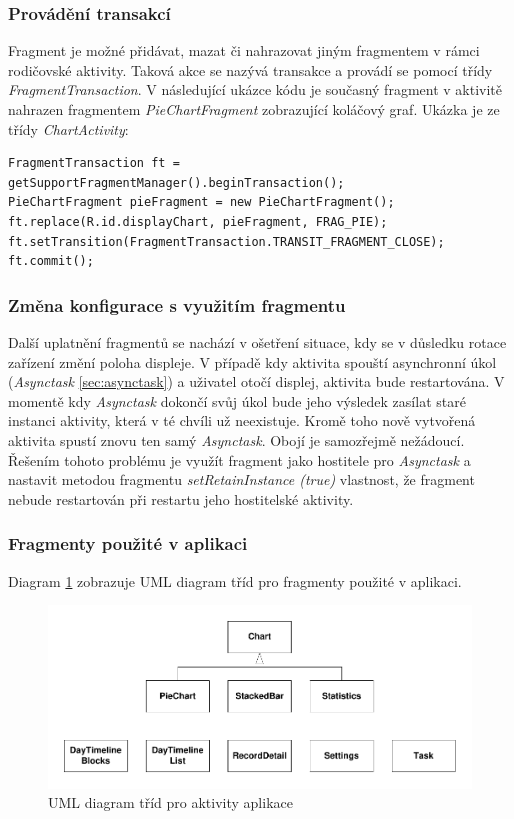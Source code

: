 \documentclass{diplomka}
\begin{document}
\subsubsection*{Provádění transakcí}
Fragment je možné přidávat, mazat či nahrazovat jiným fragmentem v rámci rodičovské aktivity. Taková akce se nazývá transakce a provádí se pomocí třídy \emph{FragmentTransaction}. V následující ukázce kódu je současný fragment v aktivitě nahrazen fragmentem \emph{PieChartFragment} zobrazující koláčový graf. Ukázka je ze třídy \emph{ChartActivity}:

\begin{lstlisting}
FragmentTransaction ft = getSupportFragmentManager().beginTransaction();
PieChartFragment pieFragment = new PieChartFragment();
ft.replace(R.id.displayChart, pieFragment, FRAG_PIE);
ft.setTransition(FragmentTransaction.TRANSIT_FRAGMENT_CLOSE);
ft.commit();
\end{lstlisting}

\subsubsection*{Změna konfigurace s využitím fragmentu}
Další uplatnění fragmentů se nachází v ošetření situace, kdy se v důsledku rotace zařízení změní poloha displeje. V případě kdy aktivita spouští asynchronní úkol (\emph{Asynctask} \ref{sec:asynctask}) a uživatel otočí displej, aktivita bude restartována. V momentě kdy \emph{Asynctask} dokončí svůj úkol bude jeho výsledek zasílat staré instanci aktivity, která v té chvíli už neexistuje. Kromě toho nově vytvořená aktivita spustí znovu ten samý \emph{Asynctask}. Obojí je samozřejmě nežádoucí. Řešením tohoto problému je využít fragment jako hostitele pro \emph{Asynctask} a nastavit metodou fragmentu \emph{setRetainInstance (true)} vlastnost, že fragment nebude restartován při restartu jeho hostitelské aktivity\cite{config}. 

\subsubsection*{Fragmenty použité v aplikaci}

Diagram \ref{fig:fragmentsuml} zobrazuje UML diagram tříd pro fragmenty použité v aplikaci.
\begin{figure}[H]
  \centering
  \includegraphics[scale=0.8]{visio/fragments.pdf}
\caption{UML diagram tříd pro aktivity aplikace}
\label{fig:fragmentsuml}
\end{figure}
\end{document}
